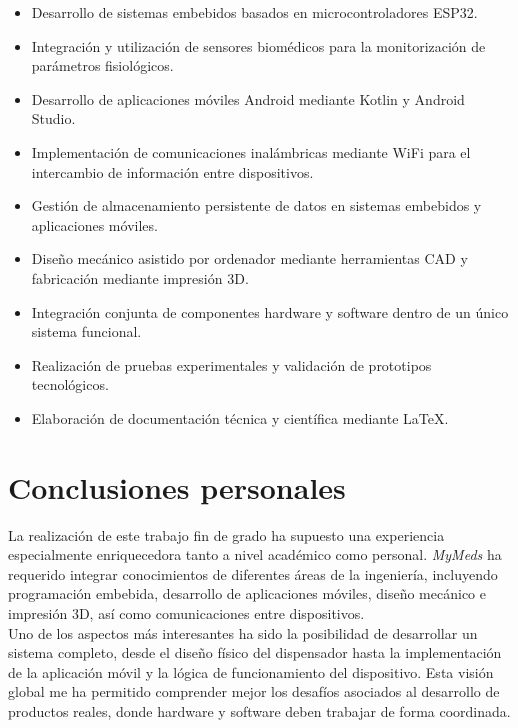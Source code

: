 \begin{itemize}

\item Desarrollo de sistemas embebidos basados en microcontroladores ESP32.

\item Integración y utilización de sensores biomédicos para la monitorización de parámetros fisiológicos.

\item Desarrollo de aplicaciones móviles Android mediante Kotlin y Android Studio.

\item Implementación de comunicaciones inalámbricas mediante WiFi para el intercambio de información entre dispositivos.

\item Gestión de almacenamiento persistente de datos en sistemas embebidos y aplicaciones móviles.

\item Diseño mecánico asistido por ordenador mediante herramientas CAD y fabricación mediante impresión 3D.

\item Integración conjunta de componentes hardware y software dentro de un único sistema funcional.

\item Realización de pruebas experimentales y validación de prototipos tecnológicos.

\item Elaboración de documentación técnica y científica mediante \LaTeX.

\end{itemize}

\section{Conclusiones personales}

La realización de este trabajo fin de grado ha supuesto una experiencia especialmente enriquecedora tanto a nivel académico como personal. \textit{MyMeds} ha requerido integrar conocimientos de diferentes áreas de la ingeniería, incluyendo programación embebida, desarrollo de aplicaciones móviles, diseño mecánico e impresión 3D, así como comunicaciones entre dispositivos.\\

Uno de los aspectos más interesantes ha sido la posibilidad de desarrollar un sistema completo, desde el diseño físico del dispensador hasta la implementación de la aplicación móvil y la lógica de funcionamiento del dispositivo. Esta visión global me ha permitido comprender mejor los desafíos asociados al desarrollo de productos reales, donde hardware y software deben trabajar de forma coordinada.\\

